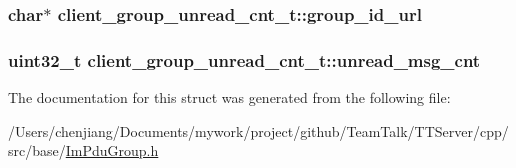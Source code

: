 \subsubsection[{group\+\_\+id\+\_\+url}]{\setlength{\rightskip}{0pt plus 5cm}char$\ast$ client\+\_\+group\+\_\+unread\+\_\+cnt\+\_\+t\+::group\+\_\+id\+\_\+url}\label{structclient__group__unread__cnt__t_abf3b3a4454e5d35aed4ebe84655e3a5d}
\hypertarget{structclient__group__unread__cnt__t_a8ca51108d3521898727d274d462a0e6e}{}
\subsubsection[{unread\+\_\+msg\+\_\+cnt}]{\setlength{\rightskip}{0pt plus 5cm}uint32\+\_\+t client\+\_\+group\+\_\+unread\+\_\+cnt\+\_\+t\+::unread\+\_\+msg\+\_\+cnt}\label{structclient__group__unread__cnt__t_a8ca51108d3521898727d274d462a0e6e}


The documentation for this struct was generated from the following file\+:\begin{DoxyCompactItemize}
\item 
/\+Users/chenjiang/\+Documents/mywork/project/github/\+Team\+Talk/\+T\+T\+Server/cpp/src/base/\hyperlink{_im_pdu_group_8h}{Im\+Pdu\+Group.\+h}\end{DoxyCompactItemize}
